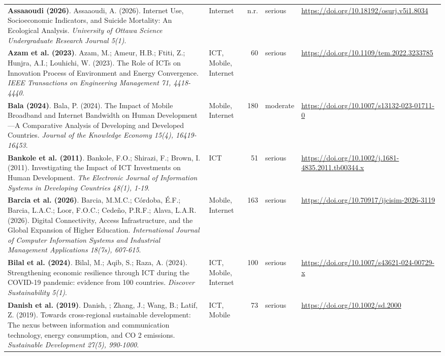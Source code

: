 {\begin{longtable}{@{}p{7.4cm} p{1.3cm} r l p{3.4cm}@{}}
\textbf{Assaaoudi (2026)}. Assaaoudi, A. (2026). Internet Use, Socioeconomic Indicators, and Suicide Mortality: An Ecological Analysis. \emph{University of Ottawa Science Undergraduate Research Journal 5(1)}. & Internet & n.r. & serious & \url{https://doi.org/10.18192/osurj.v5i1.8034} \\
\textbf{Azam et al. (2023)}. Azam, M.; Ameur, H.B.; Ftiti, Z.; Hunjra, A.I.; Louhichi, W. (2023). The Role of ICTs on Innovation Process of Environment and Energy Convergence. \emph{IEEE Transactions on Engineering Management 71, 4418-4440}. & ICT, Mobile, Internet & 60 & serious & \url{https://doi.org/10.1109/tem.2022.3233785} \\
\textbf{Bala (2024)}. Bala, P. (2024). The Impact of Mobile Broadband and Internet Bandwidth on Human Development—A Comparative Analysis of Developing and Developed Countries. \emph{Journal of the Knowledge Economy 15(4), 16419-16453}. & Mobile, Internet & 180 & moderate & \url{https://doi.org/10.1007/s13132-023-01711-0} \\
\textbf{Bankole et al. (2011)}. Bankole, F.O.; Shirazi, F.; Brown, I. (2011). Investigating the Impact of ICT Investments on Human Development. \emph{The Electronic Journal of Information Systems in Developing Countries 48(1), 1-19}. & ICT & 51 & serious & \url{https://doi.org/10.1002/j.1681-4835.2011.tb00344.x} \\
\textbf{Barcia et al. (2026)}. Barcia, M.M.C.; Córdoba, É.F.; Barcia, L.A.C.; Loor, F.O.C.; Cedeño, P.R.F.; Alava, L.A.R. (2026). Digital Connectivity, Access Infrastructure, and the Global Expansion of Higher Education. \emph{International Journal of Computer Information Systems and Industrial Management Applications 18(7s), 607-615}. & Mobile, Internet & 163 & serious & \url{https://doi.org/10.70917/ijcisim-2026-3119} \\
\textbf{Bilal et al. (2024)}. Bilal, M.; Aqib, S.; Raza, A. (2024). Strengthening economic resilience through ICT during the COVID-19 pandemic: evidence from 100 countries. \emph{Discover Sustainability 5(1)}. & ICT, Mobile, Internet & 100 & serious & \url{https://doi.org/10.1007/s43621-024-00729-x} \\
\textbf{Danish et al. (2019)}. Danish, ; Zhang, J.; Wang, B.; Latif, Z. (2019). Towards cross-regional sustainable development: The nexus between information and communication technology, energy consumption, and CO 2 emissions. \emph{Sustainable Development 27(5), 990-1000}. & ICT, Mobile & 73 & serious & \url{https://doi.org/10.1002/sd.2000} \\

\end{longtable}}

